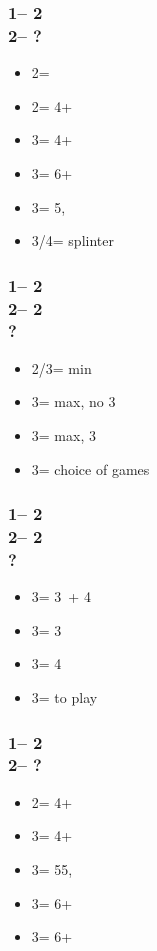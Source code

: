 \subsubsection*{1\nt -- 2\diams\\
                2\hearts -- ?}
\begin{itemize}
    \item 2\spades = \inv
    \item 2\nt = 4+\clubs\ \gf
    \item 3\clubs = 4+\diams\ \gf
    \item 3\diams = 6+\hearts\ \gf
    \item 3\hearts = 5\spades, \inv
    \item 3\spades/4\minor = splinter
\end{itemize}

\subsubsection*{1\nt -- 2\diams\\
                2\hearts -- 2\spades\\
                ?}
\begin{itemize}
    \item 2\nt/3\hearts = min
    \item 3\clubs = max, no 3\hearts
    \item 3\diams = max, 3\hearts
    \item 3\nt = choice of games
\end{itemize}

\subsubsection*{1\nt -- 2\diams\\
                2\hearts -- 2\nt\\
                ?}
\begin{itemize}
    \item 3\clubs = 3\hearts\ + 4\clubs
    \item 3\diams = 3\hearts
    \item 3\hearts = 4\clubs
    \item 3\nt = to play
\end{itemize}

\subsubsection*{1\nt -- 2\hearts\\
                2\spades -- ?}
\begin{itemize}
    \item 2\nt = 4+\clubs\ \gf
    \item 3\clubs = 4+\diams\ \gf
    \item 3\diams = 55\major, \inv
    \item 3\hearts = 6+\spades\ \gf
    \item 3\spades = 6+\spades\ \inv
\end{itemize}

